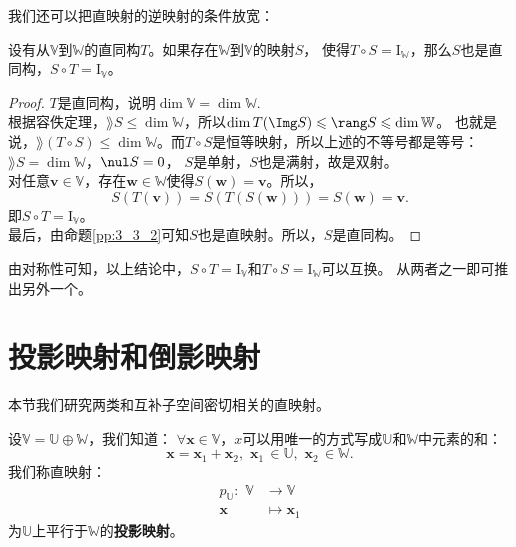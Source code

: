 \documentclass[12pt,UTF8]{ctexbook}
\begin{document}
我们还可以把直映射的逆映射的条件放宽：
\begin{pp}\label{pp:3_3_3}
    设有从$\mathbb{V}$到$\mathbb{W}$的直同构$T$。如果存在$\mathbb{W}$到$\mathbb{V}$的映射$S$，
    使得$T\circ S = \mathrm{I}_{\mathbb{W}}$，那么$S$也是直同构，$S\circ T = \mathrm{I}_{\mathbb{V}}$。
\end{pp}
\begin{proof} %
    $T$是直同构，说明$\dim \mathbb{V} = \dim \mathbb{W}$.\\
    根据容佚定理，$\rang S \leqslant \dim \mathbb{W}$，所以$\dim T(\Img S) \leqslant \rang S \leqslant \dim \mathbb{W}$。
    也就是说，$\rang (T\circ S) \leqslant \dim \mathbb{W}$。而$T\circ S$是恒等映射，所以上述的不等号都是等号：$\rang S = \dim \mathbb{W}$，$\nul S = 0$，
    $S$是单射，$S$也是满射，故是双射。\\
    对任意$\mathbf{v} \in \mathbb{V}$，存在$\mathbf{w} \in \mathbb{W}$使得$S(\mathbf{w}) = \mathbf{v}$。所以，
    $$ S(T(\mathbf{v})) = S(T(S(\mathbf{w}))) = S(\mathbf{w}) = \mathbf{v}. $$
    即$S\circ T = \mathrm{I}_{\mathbb{V}}$。\\
    最后，由命题\ref{pp:3_3_2}可知$S$也是直映射。所以，$S$是直同构。

\end{proof}


由对称性可知，以上结论中，$S\circ T = \mathrm{I}_{\mathbb{V}}$和$T\circ S = \mathrm{I}_{\mathbb{W}}$可以互换。
从两者之一即可推出另外一个。

\section{投影映射和倒影映射}

本节我们研究两类和互补子空间密切相关的直映射。
\begin{df}\label{df:3_2}
    设$\mathbb{V} = \mathbb{U} \oplus \mathbb{W}$，我们知道：
    $\forall \mathbf{x}\in \mathbb{V}$，$x$可以用唯一的方式写成$\mathbb{U}$和$\mathbb{W}$中元素的和：
    $$ \mathbf{x} = \mathbf{x}_1 + \mathbf{x}_2, \,\,\mathbf{x}_1\,\in\mathbb{U},\,\,\mathbf{x}_2\,\in\mathbb{W}.$$
    我们称直映射：
    \begin{align*}
        p_{\mathbb{U}}: \,\, \mathbb{V} & \to \mathbb{V}  \\
        \mathbf{x} & \mapsto \mathbf{x}_1 
    \end{align*}    
    为$\mathbb{U}$上平行于$\mathbb{W}$的\textbf{投影映射}。
\end{df}
\end{document}
